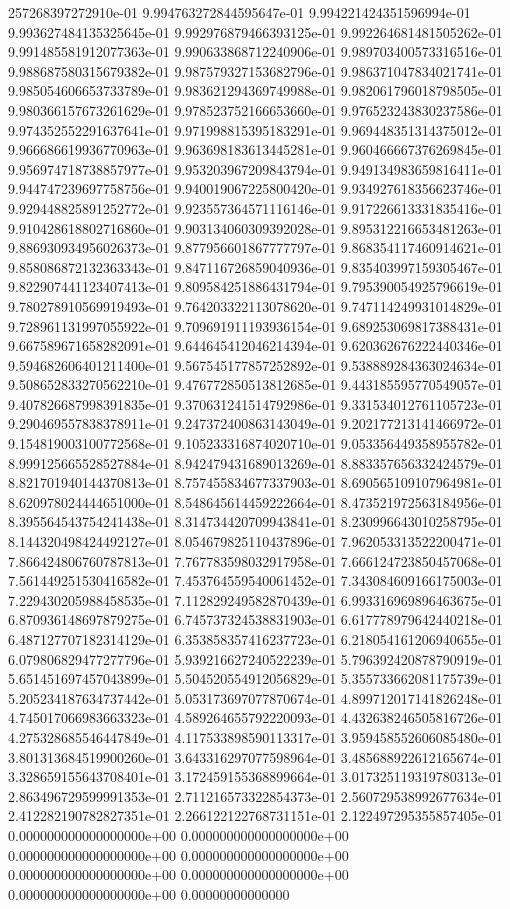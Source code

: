 257268397272910e-01	9.994763272844595647e-01	9.994221424351596994e-01	9.993627484135325645e-01	9.992976879466393125e-01	9.992264681481505262e-01	9.991485581912077363e-01	9.990633868712240906e-01	9.989703400573316516e-01	9.988687580315679382e-01	9.987579327153682796e-01	9.986371047834021741e-01	9.985054606653733789e-01	9.983621294369749988e-01	9.982061796018798505e-01	9.980366157673261629e-01	9.978523752166653660e-01	9.976523243830237586e-01	9.974352552291637641e-01	9.971998815395183291e-01	9.969448351314375012e-01	9.966686619936770963e-01	9.963698183613445281e-01	9.960466667376269845e-01	9.956974718738857977e-01	9.953203967209843794e-01	9.949134983659816411e-01	9.944747239697758756e-01	9.940019067225800420e-01	9.934927618356623746e-01	9.929448825891252772e-01	9.923557364571116146e-01	9.917226613331835416e-01	9.910428618802716860e-01	9.903134060309392028e-01	9.895312216653481263e-01	9.886930934956026373e-01	9.877956601867777797e-01	9.868354117460914621e-01	9.858086872132363343e-01	9.847116726859040936e-01	9.835403997159305467e-01	9.822907441123407413e-01	9.809584251886431794e-01	9.795390054925796619e-01	9.780278910569919493e-01	9.764203322113078620e-01	9.747114249931014829e-01	9.728961131997055922e-01	9.709691911193936154e-01	9.689253069817388431e-01	9.667589671658282091e-01	9.644645412046214394e-01	9.620362676222440346e-01	9.594682606401211400e-01	9.567545177857252892e-01	9.538889284363024634e-01	9.508652833270562210e-01	9.476772850513812685e-01	9.443185595770549057e-01	9.407826687998391835e-01	9.370631241514792986e-01	9.331534012761105723e-01	9.290469557838378911e-01	9.247372400863143049e-01	9.202177213141466972e-01	9.154819003100772568e-01	9.105233316874020710e-01	9.053356449358955782e-01	8.999125665528527884e-01	8.942479431689013269e-01	8.883357656332424579e-01	8.821701940144370813e-01	8.757455834677337903e-01	8.690565109107964981e-01	8.620978024444651000e-01	8.548645614459222664e-01	8.473521972563184956e-01	8.395564543754241438e-01	8.314734420709943841e-01	8.230996643010258795e-01	8.144320498424492127e-01	8.054679825110437896e-01	7.962053313522200471e-01	7.866424806760787813e-01	7.767783598032917958e-01	7.666124723850457068e-01	7.561449251530416582e-01	7.453764559540061452e-01	7.343084609166175003e-01	7.229430205988458535e-01	7.112829249582870439e-01	6.993316969896463675e-01	6.870936148697879275e-01	6.745737324538831903e-01	6.617778979642440218e-01	6.487127707182314129e-01	6.353858357416237723e-01	6.218054161206940655e-01	6.079806829477277796e-01	5.939216627240522239e-01	5.796392420878790919e-01	5.651451697457043899e-01	5.504520554912056829e-01	5.355733662081175739e-01	5.205234187634737442e-01	5.053173697077870674e-01	4.899712017141826248e-01	4.745017066983663323e-01	4.589264655792220093e-01	4.432638246505816726e-01	4.275328685546447849e-01	4.117533898590113317e-01	3.959458552606085480e-01	3.801313684519900260e-01	3.643316297077598964e-01	3.485688922612165674e-01	3.328659155643708401e-01	3.172459155368899664e-01	3.017325119319780313e-01	2.863496729599991353e-01	2.711216573322854373e-01	2.560729538992677634e-01	2.412282190782827351e-01	2.266122122768731151e-01	2.122497295355857405e-01	0.000000000000000000e+00	0.000000000000000000e+00	0.000000000000000000e+00	0.000000000000000000e+00	0.000000000000000000e+00	0.000000000000000000e+00	0.000000000000000000e+00	0.00000000000000